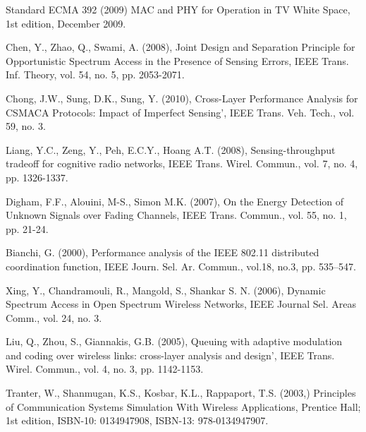 \documentclass
[journal,11pt,draftclsnofoot,onecolumn,doublespace]{tETN2e}
\begin{document}
\begin{thebibliography}{9}
Standard ECMA 392 (2009)  MAC and PHY for Operation in TV White Space, 1st edition, December 2009.

Chen, Y., Zhao, Q., Swami, A. (2008), Joint Design and Separation Principle for Opportunistic Spectrum Access in the Presence of Sensing Errors, IEEE Trans. Inf. Theory, vol. 54, no. 5, pp. 2053-2071.

Chong, J.W., Sung, D.K., Sung, Y. (2010), Cross-Layer Performance Analysis for CSMACA Protocols: Impact of Imperfect Sensing’, IEEE Trans. Veh. Tech., vol. 59, no. 3.   

Liang, Y.C., Zeng, Y., Peh, E.C.Y., Hoang A.T. (2008), Sensing-throughput tradeoff for cognitive radio networks, IEEE Trans. Wirel. Commun., vol. 7, no. 4, pp. 1326-1337.

Digham, F.F., Alouini, M-S., Simon M.K. (2007), On the Energy Detection of Unknown Signals over Fading Channels, IEEE Trans. Commun., vol. 55, no. 1, pp. 21-24.

Bianchi, G. (2000), Performance analysis of the IEEE 802.11 distributed coordination function, IEEE Journ. Sel. Ar. Commun.,  vol.18, no.3, pp. 535–547.

Xing, Y., Chandramouli, R., Mangold, S., Shankar S. N. (2006), Dynamic Spectrum Access in Open Spectrum Wireless Networks, IEEE Journal Sel. Areas Comm., vol. 24, no. 3.

Liu, Q., Zhou, S., Giannakis, G.B. (2005), Queuing with adaptive modulation and coding over wireless links: cross-layer analysis and design’, IEEE Trans. Wirel. Commun., vol. 4, no. 3, pp. 1142-1153.

Tranter, W., Shanmugan, K.S., Kosbar, K.L., Rappaport, T.S. (2003,) Principles of Communication Systems Simulation With Wireless Applications, Prentice Hall; 1st edition, ISBN-10: 0134947908, ISBN-13: 978-0134947907. 

\end{thebibliography}
\end{document}

